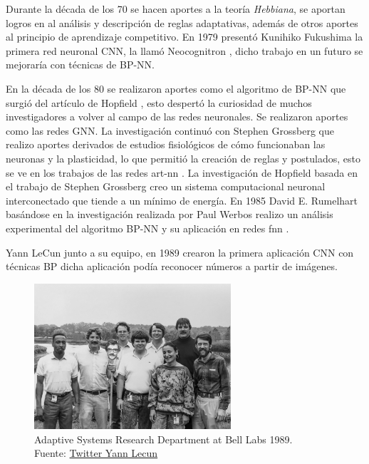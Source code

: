 Durante la década de los 70 se hacen aportes a la teoría \textit{Hebbiana}, se aportan logros en al análisis y descripción de reglas adaptativas, además de otros aportes al principio de aprendizaje competitivo.
En 1979 presentó {Kunihiko Fukushima} la primera red neuronal \gls{CNN}, la llamó Neocognitron \cite{fukushima1979neural}, dicho trabajo en un futuro se mejoraría con técnicas de \gls{BP-NN}.

En la década de los 80 se realizaron aportes como el algoritmo de \gls{BP-NN} que surgió del artículo de {Hopfield} \cite{hopfield1982neural}, esto despertó la curiosidad de muchos investigadores a volver al campo de las redes neuronales.
Se realizaron aportes como las redes \gls{GNN}.
La investigación continuó con {Stephen Grossberg} que realizo aportes derivados de estudios fisiológicos de cómo funcionaban las neuronas y la plasticidad, lo que permitió la creación de reglas y postulados, esto se ve en los trabajos de las redes \acrshort{art-nn} \cite{grossberg1987competitive}.
La investigación de {Hopfield} basada en el trabajo de {Stephen Grossberg} creo un sistema computacional neuronal interconectado que tiende a un mínimo de energía.
En 1985 {David E. Rumelhart} basándose en la investigación realizada por {Paul Werbos} \cite{etde_5080493} realizo un análisis experimental del algoritmo \gls{BP-NN} y su aplicación en redes \acrshort{fnn} \cite{rumelhart1985learning}.

{Yann LeCun} junto a su equipo, en 1989 crearon la primera aplicación \gls{CNN} con técnicas \gls{BP} dicha aplicación podía reconocer números a partir de imágenes.

\begin{figure}[H]
    \centering
    \includegraphics[width=0.65\textwidth]{figures/yann-lecun - EyIwmEDW8AIQs1C.jpeg}
    \caption{Adaptive Systems Research Department at Bell Labs 1989.\\Fuente: \href{https://twitter.com/ylecun/status/1378718317695934465}{Twitter Yann Lecun}}
    \label{fig:adaptive-systems-research-department-at-bell-labs}
\end{figure}

